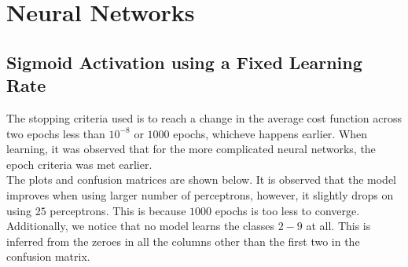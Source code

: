 \documentclass[11pt]{article}
\begin{document}
\newpage

\section{Neural Networks}

\subsection{Sigmoid Activation using a Fixed Learning Rate}
The stopping criteria used is to reach a change in the average cost function across two epochs less than $10^{-8}$ or $1000$ epochs, whicheve happens earlier. When learning, it was observed that for the more complicated neural networks, the epoch criteria was met earlier.\\
The plots and confusion matrices are shown below. It is observed that the model improves when using larger number of perceptrons, however, it slightly drops on using $25$ perceptrons. This is because $1000$ epochs is too less to converge.\\
Additionally, we notice that no model learns the classes $2-9$ at all. This is inferred from the zeroes in all the columns other than the first two in the confusion matrix.
\end{document}
